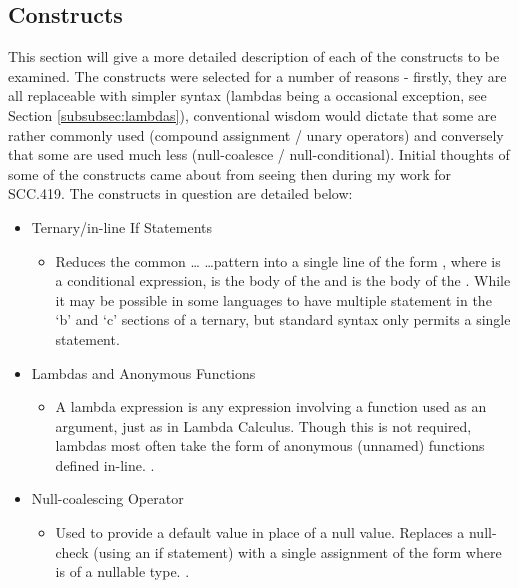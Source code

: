 \documentclass{article}
\begin{document}
    \subsection{Constructs}
        \label{subsec:constructs}
        This section will give a more detailed description of each of the constructs to be examined. The constructs were selected for a number of reasons - firstly, they are all replaceable with simpler syntax (lambdas being a occasional exception, see Section \ref{subsubsec:lambdas}), conventional wisdom would dictate that some are rather commonly used (compound assignment / unary operators) and conversely that some are used much less (null-coalesce / null-conditional). Initial thoughts of some of the constructs came about from seeing then during my work for SCC.419. The constructs in question are detailed below:
        \newpage
        \begin{itemize}
            \item Ternary/in-line If Statements
                \begin{itemize}
                    \item Reduces the common  \dots {} \dots pattern into a single line of the form , where  is a conditional expression,  is the body of the  and  is the body of the . While it may be possible in some languages to have multiple statement in the `b' and `c' sections of a ternary, but standard syntax only permits a single statement.
                \end{itemize}
            \item Lambdas and Anonymous Functions
                \begin{itemize}
                    \item A lambda expression is any expression involving a function used as an argument, just as in Lambda Calculus. Though this is not required, lambdas most often take the form of anonymous (unnamed) functions defined in-line. \citep{javaLambdas}.
                \end{itemize}
            \item Null-coalescing Operator
                \begin{itemize}
                    \item Used to provide a default value in place of a null value. Replaces a null-check (using an if statement) with a single assignment of the form \newline{} where  is of a nullable type. \citep{cs5Spec}.

\end{itemize}
\end{itemize}
\end{document}
